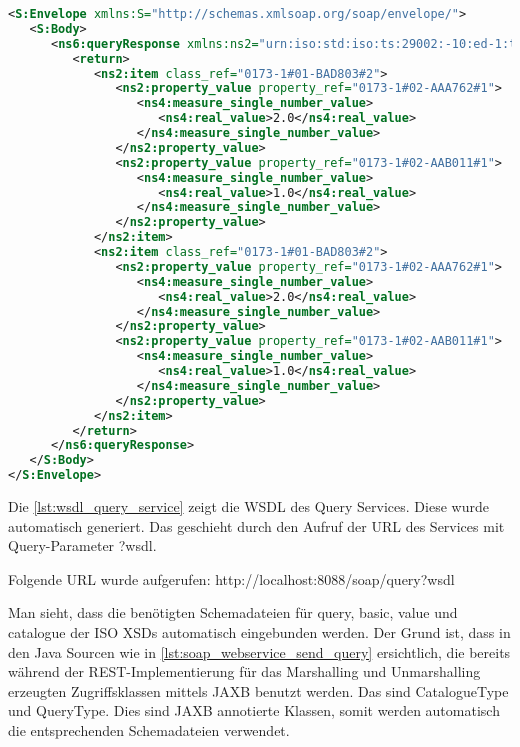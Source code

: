  \begin{lstlisting}[caption=Beispielantwort SOAP Webservice response, language=XML, label=lst:soap_response]
<S:Envelope xmlns:S="http://schemas.xmlsoap.org/soap/envelope/">
   <S:Body>
      <ns6:queryResponse xmlns:ns2="urn:iso:std:iso:ts:29002:-10:ed-1:tech:xml-schema:catalogue" xmlns:ns3="urn:iso:std:iso:ts:29002:-4:ed-1:tech:xml-schema:basic" xmlns:ns4="urn:iso:std:iso:ts:29002:-10:ed-1:tech:xml-schema:value" xmlns:ns5="urn:iso:std:iso:ts:29002:-31:ed-1:tech:xml-schema:query" xmlns:ns6="http://webservice.plib.feu.de/">
         <return>
            <ns2:item class_ref="0173-1#01-BAD803#2">
               <ns2:property_value property_ref="0173-1#02-AAA762#1">
                  <ns4:measure_single_number_value>
                     <ns4:real_value>2.0</ns4:real_value>
                  </ns4:measure_single_number_value>
               </ns2:property_value>
               <ns2:property_value property_ref="0173-1#02-AAB011#1">
                  <ns4:measure_single_number_value>
                     <ns4:real_value>1.0</ns4:real_value>
                  </ns4:measure_single_number_value>
               </ns2:property_value>
            </ns2:item>
            <ns2:item class_ref="0173-1#01-BAD803#2">
               <ns2:property_value property_ref="0173-1#02-AAA762#1">
                  <ns4:measure_single_number_value>
                     <ns4:real_value>2.0</ns4:real_value>
                  </ns4:measure_single_number_value>
               </ns2:property_value>
               <ns2:property_value property_ref="0173-1#02-AAB011#1">
                  <ns4:measure_single_number_value>
                     <ns4:real_value>1.0</ns4:real_value>
                  </ns4:measure_single_number_value>
               </ns2:property_value>
            </ns2:item>
         </return>
      </ns6:queryResponse>
   </S:Body>
</S:Envelope>  
 \end{lstlisting}  
 
 Die \autoref{lst:wsdl_query_service} zeigt die WSDL des Query Services. Diese wurde automatisch generiert. Das geschieht durch den Aufruf der URL des Services mit Query-Parameter ?wsdl. 
 
 Folgende URL wurde aufgerufen: http://localhost:8088/soap/query?wsdl
 
 Man sieht, dass die benötigten Schemadateien für query, basic, value und catalogue der ISO XSDs automatisch eingebunden werden. Der Grund ist, dass in den Java Sourcen wie in \autoref{lst:soap_webservice_send_query} ersichtlich, die bereits während der REST-Implementierung für das Marshalling und Unmarshalling erzeugten Zugriffsklassen mittels JAXB benutzt werden. Das sind CatalogueType und QueryType. Dies sind JAXB annotierte Klassen, somit werden automatisch die entsprechenden Schemadateien verwendet.
 

